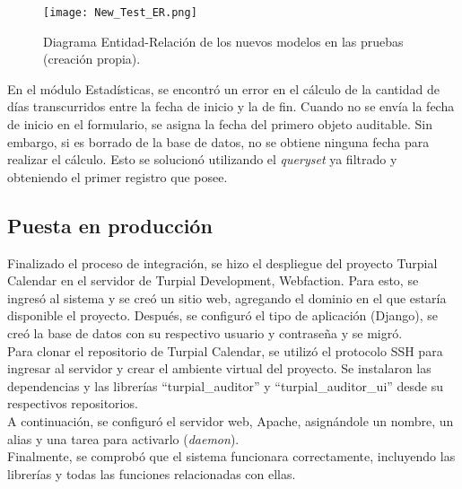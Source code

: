 \begin{figure}[h]
\centering
\texttt{[image: New\_Test\_ER.png]}
\caption{ Diagrama Entidad-Relación de los nuevos modelos en las pruebas (creación propia).}
\label{fig:figura6.13}
\end{figure}


En el módulo Estadísticas, se encontró un error en el cálculo de la cantidad de días transcurridos entre la fecha de inicio y la de fin. Cuando no se envía la fecha de inicio en el formulario, se asigna la fecha del primero objeto auditable. Sin embargo, si es borrado de la base de datos, no se obtiene ninguna fecha para realizar el cálculo. Esto se solucionó utilizando el \textit{queryset} ya filtrado y obteniendo el primer registro que posee.

\subsection{Puesta en producción}

Finalizado el proceso de integración, se hizo el despliegue del proyecto Turpial Calendar en el servidor de Turpial Development, Webfaction. Para esto, se ingresó al sistema y se creó un sitio web, agregando el dominio en el que estaría disponible el proyecto. Después, se configuró el tipo de aplicación (Django), se creó la base de datos con su respectivo usuario y contraseña y se migró.\\

Para clonar el repositorio de Turpial Calendar, se utilizó el protocolo SSH para ingresar al servidor y crear el ambiente virtual del proyecto. Se instalaron las dependencias y las librerías “turpial\_auditor” y “turpial\_auditor\_ui” desde su respectivos repositorios.\\

A continuación, se configuró el servidor web, Apache, asignándole un nombre, un alias y una tarea para activarlo (\textit{daemon}). \\

Finalmente, se comprobó que el sistema funcionara correctamente, incluyendo las librerías y todas las funciones relacionadas con ellas.
